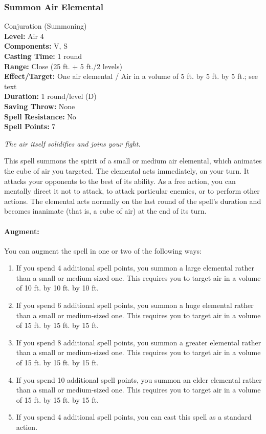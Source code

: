 \subsubsection{Summon Air Elemental}
\label{Spell:SummonAirElemental}
Conjuration (Summoning)
\\ \textbf{Level:} Air 4
\\ \textbf{Components:} V, S
\\ \textbf{Casting Time:} 1 round
\\ \textbf{Range:} Close (25 ft. + 5 ft./2 levels)
\\ \textbf{Effect/Target:} One air elemental / Air in a volume of 5 ft. by 5 ft. by 5 ft.; see text
\\ \textbf{Duration:} 1 round/level (D)
\\ \textbf{Saving Throw:} None
\\ \textbf{Spell Resistance:} No
\\ \textbf{Spell Points:} 7

\emph{The air itself solidifies and joins your fight.}

This spell summons the spirit of a small or medium air elemental, which animates the cube of air you targeted.
The elemental acts immediately, on your turn.
It attacks your opponents to the best of its ability. 
As a free action, you can mentally direct it not to attack, to attack particular enemies, or to perform other actions. 
The elemental acts normally on the last round of the spell's duration and becomes inanimate (that is, a cube of air) at the end of its turn.

\paragraph{Augment:} You can augment the spell in one or two of the following ways: 
\begin{enumerate}
 \item If you spend 4 additional spell points, you summon a large elemental rather than a small or medium-sized one.
 This requires you to target air in a volume of 10 ft. by 10 ft. by 10 ft.
 \item If you spend 6 additional spell points, you summon a huge elemental rather than a small or medium-sized one.
 This requires you to target air in a volume of 15 ft. by 15 ft. by 15 ft.
 \item If you spend 8 additional spell points, you summon a greater elemental rather than a small or medium-sized one.
 This requires you to target air in a volume of 15 ft. by 15 ft. by 15 ft.
 \item If you spend 10 additional spell points, you summon an elder elemental rather than a small or medium-sized one.
 This requires you to target air in a volume of 15 ft. by 15 ft. by 15 ft.
 \item If you spend 4 additional spell points, you can cast this spell as a standard action.
\end{enumerate}
